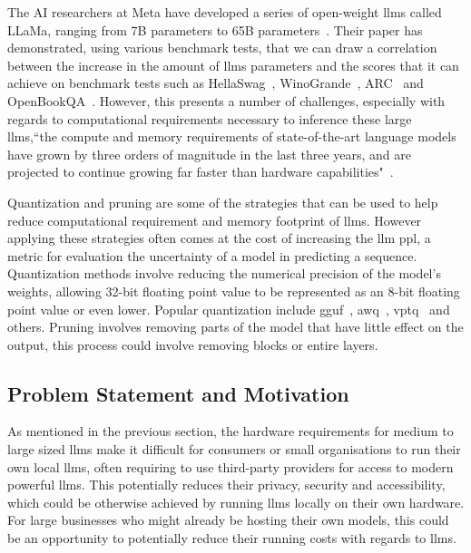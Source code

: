 \documentclass{ifacconf}
\begin{document}
	The AI researchers at Meta have developed a series of open-weight \glspl{llm} called LLaMa, ranging from 7B parameters to 65B parameters~\cite{touvron2023llamaopenefficientfoundation}. Their paper has demonstrated, using various benchmark tests, that we can draw a correlation between the increase in the amount of \glspl{llm} parameters and the scores that it can achieve on benchmark tests such as HellaSwag~\cite{zellers2019hellaswagmachinereallyfinish}, WinoGrande~\cite{sakaguchi2019winograndeadversarialwinogradschema}, ARC~\cite{clark2018thinksolvedquestionanswering} and OpenBookQA~\cite{mihaylov2018suitarmorconductelectricity}. However, this presents a number of challenges, especially with regards to computational requirements necessary to inference these large \glspl{llm},``the compute and memory requirements of state-of-the-art language models have grown by three orders of magnitude in the last three years, and are projected to continue growing far faster than hardware capabilities"~\cite[p.~97]{bommasani2022opportunitiesrisksfoundationmodels}.
	
	Quantization and pruning are some of the strategies that can be used to help reduce computational requirement and memory footprint of \glspl{llm}. However applying these strategies often comes at the cost of increasing the \gls{llm} \gls{ppl}, a metric for evaluation the uncertainty of a model in predicting a sequence. Quantization methods involve reducing the numerical precision of the model's weights, allowing 32-bit floating point value to be represented as an 8-bit floating point value or even lower. Popular quantization include \gls{gguf}~\cite{llamacpp, ggml}, \gls{awq}~\cite{lin2024awqactivationawareweightquantization}, \gls{vptq}~\cite{liu2024vptqextremelowbitvector} and others. Pruning involves removing parts of the model that have little effect on the output, this process could involve removing blocks or entire layers.
	
	\subsection{Problem Statement and Motivation}
	
	As mentioned in the previous section, the hardware requirements for medium to large sized  \glspl{llm} make it difficult for consumers or small organisations to run their own local  \glspl{llm}, often requiring to use third-party providers for access to modern powerful  \glspl{llm}. This potentially reduces their privacy, security and accessibility, which could be otherwise achieved by running  \glspl{llm} locally on their own hardware. For large businesses who might already be hosting their own models, this could be an opportunity to potentially reduce their running costs with regards to \glspl{llm}.
	
\end{document}
